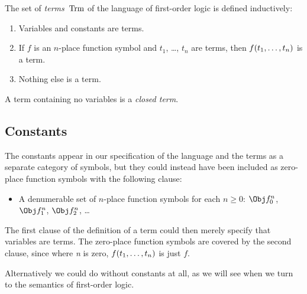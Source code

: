 \documentclass[syntax-and-semantics]{subfiles}
\begin{document}


\begin{defn}[Term]
The set of \emph{terms}~$\Trm$ of the language of first-order logic is
defined inductively:
\begin{enumerate}
\item Variables and constants are terms.
\item If $f$ is an $n$-place function symbol and $t_1$, \dots, $t_n$
  are terms, then ${ f(t_1, \ldots, t_n) }$ is a term.
\item Nothing else is a term.
\end{enumerate}
A term containing no variables is a \emph{closed term}.
\end{defn}

\subsection*{Constants}

The constants appear in our specification of the language and the terms as a separate category of symbols, but they could instead have been included as zero-place function symbols with the following clause:
\begin{itemize}
\item A denumerable set of $n$-place function symbols for each $n\ge 0$: $\Obj f^n_0$, $\Obj f^n_1$, $\Obj f^n_2$, \dots
\end{itemize}

The first clause of the definition of a term could then merely specify that variables are terms. The zero-place function symbols are covered by the second clause, since where \textit{n} is zero, ${ f(t_1, \ldots, t_n) }$ is just $f$.

Alternatively we could do without constants at all, as we will see when we turn to the semantics of first-order logic.
\end{document}
